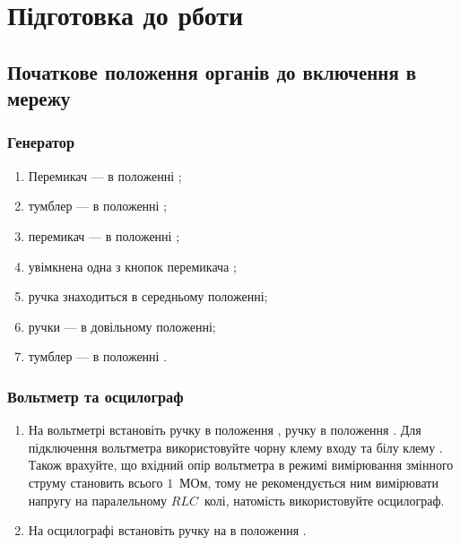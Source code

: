 \section{Підготовка до рботи}

\subsection*{Початкове положення органів до включення в мережу}

\subsubsection*{Генератор }

\begin{enumerate}
	\item Перемикач \circled{\ref{btn:VscaleLim}}   --- в положенні  ;
	\item тумблер \circled{\ref{btn:IntR}}   --- в положенні ;
	\item перемикач \circled{\ref{btn:ExtR}}   --- в положенні ;
	\item увімкнена одна з кнопок перемикача \circled{\ref{btn:fMulyiply}}  ;
	\item ручка \circled{\ref{btn:regexit}}   знаходиться в середньому положенні;
	\item ручки \circled{\ref{btn:fHz}}   --- в довільному положенні;
	\item тумблер \circled{\ref{btn:Vscale}}   --- в положенні .
\end{enumerate}

\subsubsection*{Вольтметр {} та осцилограф {}}

\begin{enumerate}
	\item На вольтметрі  встановіть ручку \circled{\ref{btn:Limit}}  в положення , ручку \circled{\ref{btn:Rod}}   в положення . Для підключення вольтметра використовуйте чорну клему входу  \circled{\ref{pin:O}}  та білу клему  \circled{\ref{pin:Ohm}} . Також врахуйте, що вхідний опір вольтметра в режимі вимірювання змінного струму становить всього $1$~МОм, тому не рекомендується ним вимірювати напругу на паралельному $RLC$~колі, натомість використовуйте осцилограф.
	\item На осцилографі {} встановіть ручку  на  в положення .
\end{enumerate}

